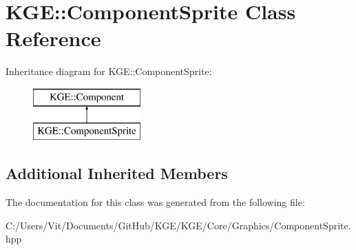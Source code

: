 \hypertarget{class_k_g_e_1_1_component_sprite}{\section{K\-G\-E\-:\-:Component\-Sprite Class Reference}
\label{class_k_g_e_1_1_component_sprite}
}
Inheritance diagram for K\-G\-E\-:\-:Component\-Sprite\-:\begin{figure}[H]
\begin{center}
\leavevmode
\includegraphics[height=2.000000cm]{class_k_g_e_1_1_component_sprite}
\end{center}
\end{figure}
\subsection*{Additional Inherited Members}


The documentation for this class was generated from the following file\-:\begin{DoxyCompactItemize}
\item 
C\-:/\-Users/\-Vit/\-Documents/\-Git\-Hub/\-K\-G\-E/\-K\-G\-E/\-Core/\-Graphics/Component\-Sprite.\-hpp\end{DoxyCompactItemize}
